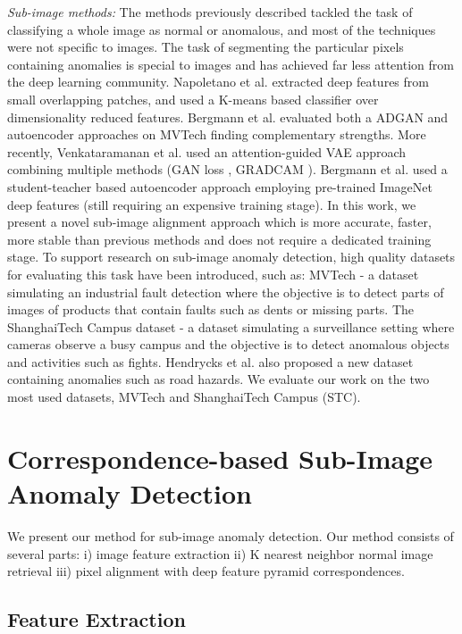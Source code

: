 \documentclass[runningheads]{llncs}
\begin{document}
\textit{Sub-image methods:} The methods previously described tackled the task of classifying a whole image as normal or anomalous, and most of the techniques were not specific to images. The task of segmenting the particular pixels containing anomalies is special to images and has achieved far less attention from the deep learning community. Napoletano et al. \cite{napoletano2018anomaly} extracted deep features from small overlapping patches, and used a K-means based classifier over dimensionality reduced features. Bergmann et al. \cite{bergmann2019mvtec} evaluated both a ADGAN and autoencoder approaches on MVTech finding complementary strengths. More recently, Venkataramanan et al. \cite{venkataramanan2019attention} used an attention-guided VAE approach combining multiple methods (GAN loss \cite{goodfellow2014generative}, GRADCAM \cite{selvaraju2017grad}). Bergmann et al. \cite{bergmann2019uninformed} used a student-teacher based autoencoder approach employing pre-trained ImageNet deep features (still requiring an expensive training stage). In this work, we present a novel sub-image alignment approach which is more accurate, faster, more stable than previous methods and does not require a dedicated training stage. To support research on sub-image anomaly detection, high quality datasets for evaluating this task have been introduced, such as: MVTech \cite{bergmann2019mvtec} - a dataset simulating an industrial fault detection where the objective is to detect parts of images of products that contain faults such as dents or missing parts. The ShanghaiTech Campus dataset \cite{luo2017revisit} - a dataset simulating a surveillance setting where cameras observe a busy campus and the objective is to detect anomalous objects and activities such as fights. Hendrycks et al. \cite{hendrycks2019benchmark} also proposed a new dataset containing anomalies such as road hazards. We evaluate our work on the two most used datasets, MVTech and ShanghaiTech Campus (STC).     

\section{Correspondence-based Sub-Image Anomaly Detection}
\label{sec:method}

We present our method for sub-image anomaly detection. Our method consists of several parts: i) image feature extraction ii) K nearest neighbor normal image retrieval iii) pixel alignment with deep feature pyramid correspondences.

\subsection{Feature Extraction} 
\label{sec:method:extract} 
\end{document}
